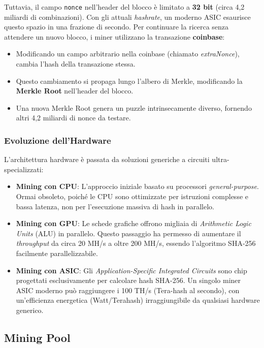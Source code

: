 Tuttavia, il campo \texttt{nonce} nell'header del blocco è limitato a \textbf{32 bit} (circa 4,2 miliardi di combinazioni). Con gli attuali \textit{hashrate}, un moderno ASIC esaurisce questo spazio in una frazione di secondo. Per continuare la ricerca senza attendere un nuovo blocco, i miner utilizzano la transazione \textbf{coinbase}:
\begin{itemize}
    \item Modificando un campo arbitrario nella coinbase (chiamato \textit{extraNonce}), cambia l'hash della transazione stessa.
    \item Questo cambiamento si propaga lungo l'albero di Merkle, modificando la \textbf{Merkle Root} nell'header del blocco.
    \item Una nuova Merkle Root genera un puzzle intrinsecamente diverso, fornendo altri 4,2 miliardi di nonce da testare.
\end{itemize}

\subsubsection{Evoluzione dell'Hardware}

L'architettura hardware è passata da soluzioni generiche a circuiti ultra-specializzati:
\begin{itemize}
    \item \textbf{Mining con CPU}: L'approccio iniziale basato su processori \textit{general-purpose}. Ormai obsoleto, poiché le CPU sono ottimizzate per istruzioni complesse e bassa latenza, non per l'esecuzione massiva di hash in parallelo.
    \item \textbf{Mining con GPU}: Le schede grafiche offrono migliaia di \textit{Arithmetic Logic Units} (ALU) in parallelo. Questo passaggio ha permesso di aumentare il \textit{throughput} da circa 20 MH/s a oltre 200 MH/s, essendo l'algoritmo SHA-256 facilmente parallelizzabile.
    \item \textbf{Mining con ASIC}: Gli \textit{Application-Specific Integrated Circuits} sono chip progettati esclusivamente per calcolare hash SHA-256. Un singolo miner ASIC moderno può raggiungere i 100 TH/s (Tera-hash al secondo), con un'efficienza energetica (Watt/Terahash) irraggiungibile da qualsiasi hardware generico.
\end{itemize}

\subsection{Mining Pool}

